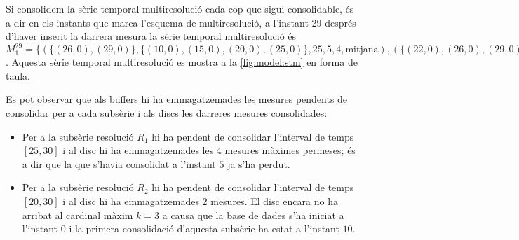 \begin{example} 
Si consolidem la sèrie temporal multiresolució cada cop que sigui
consolidable, és a dir en els instants que marca l'esquema de
multiresolució, a l'instant 29 després d'haver inserit la darrera
mesura la sèrie temporal multiresolució és $M_1^{29} = \{ (
\{(26,0),(29,0)\},\{(10,0),(15,0),(20,0),(25,0)\}, 25 , 5 ,4 ,
\text{mitjana} ), ( \{(22,0),(26,0),(29,0)\}, \{(10,0),(20,0)\},
20 , 10 ,3 , \text{mitjana} ) \}$.  Aquesta sèrie temporal
multiresolució es mostra a la \autoref{fig:model:stm} en forma de
taula.


Es pot observar que als buffers hi ha emmagatzemades les mesures
pendents de consolidar per a cada subsèrie i als discs les darreres
mesures consolidades:
\begin{itemize}
\item Per a la subsèrie resolució $R_1$ hi ha pendent de consolidar
  l'interval de temps $[25,30]$ i al disc hi ha emmagatzemades les 4
  mesures màximes permeses; és a dir que la que s'havia consolidat a
  l'instant $5$ ja s'ha perdut.
\item Per a la subsèrie resolució $R_2$ hi ha pendent de consolidar
  l'interval de temps $[20,30]$ i al disc hi ha emmagatzemades 2
  mesures. El disc encara no ha arribat al cardinal màxim $k=3$ a
  causa que la base de dades s'ha iniciat a l'instant $0$ i la primera
  consolidació d'aquesta subsèrie ha estat a l'instant $10$.
\end{itemize}





\end{example}
